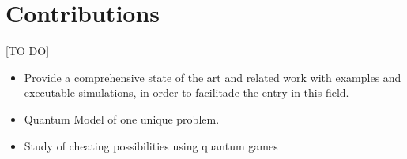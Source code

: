 \section{Contributions}
\label{sec:int_contributions}

[TO DO]

\begin{itemize}

\item Provide a comprehensive state of the art and related work with examples and executable simulations, in order to facilitade the entry in this field.

\item Quantum Model of one unique problem. 

\item Study of cheating possibilities using quantum games

\end{itemize}